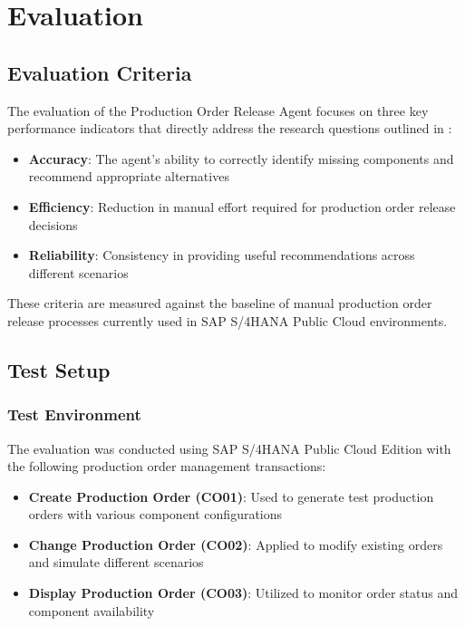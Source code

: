 \chapter{Evaluation}
\label{chap:Evaluation}

\section{Evaluation Criteria}

The evaluation of the Production Order Release Agent focuses on three key performance indicators that directly address the research questions outlined in :

\begin{itemize}
    \item \textbf{Accuracy}: The agent's ability to correctly identify missing components and recommend appropriate alternatives
    \item \textbf{Efficiency}: Reduction in manual effort required for production order release decisions
    \item \textbf{Reliability}: Consistency in providing useful recommendations across different scenarios
\end{itemize}

These criteria are measured against the baseline of manual production order release processes currently used in SAP S/4HANA Public Cloud environments.

\section{Test Setup}

\subsection{Test Environment}

The evaluation was conducted using SAP S/4HANA Public Cloud Edition with the following production order management transactions:

\begin{itemize}
    \item \textbf{Create Production Order (CO01)}: Used to generate test production orders with various component configurations
    \item \textbf{Change Production Order (CO02)}: Applied to modify existing orders and simulate different scenarios
    \item \textbf{Display Production Order (CO03)}: Utilized to monitor order status and component availability
\end{itemize}

